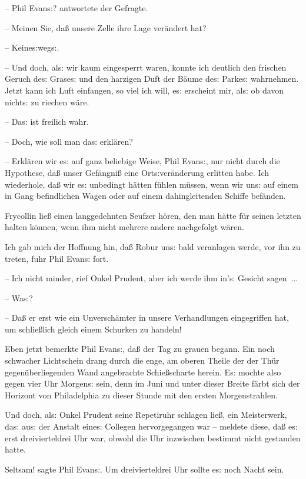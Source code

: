 \documentclass[oneside,12pt]{book}
\newcommand{\s}{s:}
\begin{document}
-- Phil Evan{\s}? antwortete der Gefragte.

-- Meinen Sie, da{\ss} unsere Zelle ihre Lage ver\"andert hat?

-- Keine{\s}weg{\s}.

-- Und doch, al{\s} wir kaum eingesperrt waren, konnte ich deutlich
den frischen Geruch de{\s} Grase{\s} und den harzigen Duft der
B\"aume de{\s} Parke{\s} wahrnehmen. Jetzt kann ich Luft einfangen,
so viel ich will, e{\s} erscheint mir, al{\s} ob davon nicht{\s} zu
riechen w\"are.

-- Da{\s} ist freilich wahr.

-- Doch, wie soll man da{\s} erkl\"aren?

-- Erkl\"aren wir e{\s} auf ganz beliebige Weise, Phil Evan{\s}, nur
nicht durch die Hypothese, da{\ss} unser Gef\"angni{\ss} eine
Ort{\s}ver\"anderung erlitten habe. Ich wiederhole, da{\ss} wir e{\s}
unbedingt h\"atten f\"uhlen m\"ussen, wenn wir un{\s} auf einem in
Gang befindlichen Wagen oder auf einem dahingleitenden Schiffe
bef\"anden.{\grqq}

Frycollin lie{\ss} einen langgedehnten Seufzer h\"oren, den man
h\"atte f\"ur seinen letzten halten k\"onnen, wenn ihm nicht mehrere
andere nachgefolgt w\"aren.

{\glqq}Ich gab mich der Hoffnung hin, da{\ss} Robur un{\s} bald
veranlagen werde, vor ihn zu treten, fuhr Phil Evan{\s} fort.

-- Ich nicht minder, rief Onkel Prudent, aber ich werde ihm in'{\s}
Gesicht sagen~...

-- Wa{\s}?

-- Da{\ss} er erst wie ein Unversch\"amter in unsere Verhandlungen
eingegriffen hat, um schlie{\ss}lich gleich einem Schurken zu
handeln!{\grqq}

Eben jetzt bemerkte Phil Evan{\s}, da{\ss} der Tag zu grauen begann.
Ein noch schwacher Lichtschein drang durch die enge, am oberen Theile
der der Th\"ur gegen\"uberliegenden Wand angebrachte Schie{\ss}scharte
herein. E{\s} mochte also gegen vier Uhr Morgen{\s} sein, denn im
Juni und unter dieser Breite f\"arbt sich der Horizont von
Philadelphia zu dieser Stunde mit den ersten Morgenstrahlen.

Und doch, al{\s} Onkel Prudent seine Repetiruhr schlagen lie{\ss},
ein Meisterwerk, da{\s} au{\s} der Anstalt eine{\s} Collegen
hervorgegangen war -- meldete diese, da{\ss} e{\s} erst
dreivierteldrei Uhr war, obwohl die Uhr inzwischen bestimmt nicht
gestanden hatte.

{\glqq}Seltsam! sagte Phil Evan{\s}. Um dreivierteldrei Uhr sollte
e{\s} noch Nacht sein.
\end{document}
